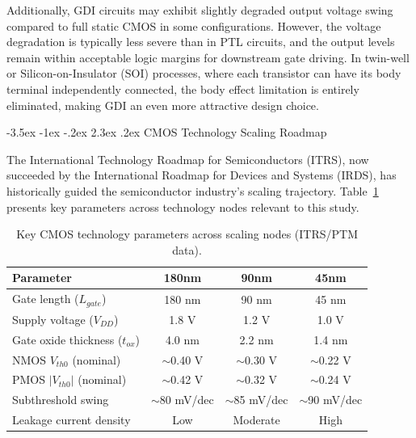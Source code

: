 \documentclass[12pt,a4paper,oneside]{report}
\makeatletter
\renewcommand\section{\@startsection {section}{1}{\z@}%
                                   {-3.5ex \@plus -1ex \@minus -.2ex}%
                                   {2.3ex \@plus.2ex}%
                                   {\normalfont\normalsize\bfseries}}
\makeatother
\begin{document}
Additionally, GDI circuits may exhibit slightly degraded output voltage swing compared to full static CMOS in some configurations. However, the voltage degradation is typically less severe than in PTL circuits, and the output levels remain within acceptable logic margins for downstream gate driving. In twin-well or Silicon-on-Insulator (SOI) processes, where each transistor can have its body terminal independently connected, the body effect limitation is entirely eliminated, making GDI an even more attractive design choice.

\section{CMOS Technology Scaling Roadmap}

The International Technology Roadmap for Semiconductors (ITRS), now succeeded by the International Roadmap for Devices and Systems (IRDS), has historically guided the semiconductor industry's scaling trajectory. Table~\ref{tab:tech_roadmap} presents key parameters across technology nodes relevant to this study.

\begin{table}[H]
\centering
\caption{Key CMOS technology parameters across scaling nodes (ITRS/PTM data).}
\label{tab:tech_roadmap}
\vspace{0.2cm}
\begin{tabular}{|l|c|c|c|}
\hline
\textbf{Parameter} & \textbf{180nm} & \textbf{90nm} & \textbf{45nm} \\
\hline
Gate length ($L_{gate}$) & 180 nm & 90 nm & 45 nm \\
\hline
Supply voltage ($V_{DD}$) & 1.8 V & 1.2 V & 1.0 V \\
\hline
Gate oxide thickness ($t_{ox}$) & 4.0 nm & 2.2 nm & 1.4 nm \\
\hline
NMOS $V_{th0}$ (nominal) & $\sim$0.40 V & $\sim$0.30 V & $\sim$0.22 V \\
\hline
PMOS $|V_{th0}|$ (nominal) & $\sim$0.42 V & $\sim$0.32 V & $\sim$0.24 V \\
\hline
Subthreshold swing & $\sim$80 mV/dec & $\sim$85 mV/dec & $\sim$90 mV/dec \\
\hline
Leakage current density & Low & Moderate & High \\
\hline
\end{tabular}
\end{table}
\end{document}
